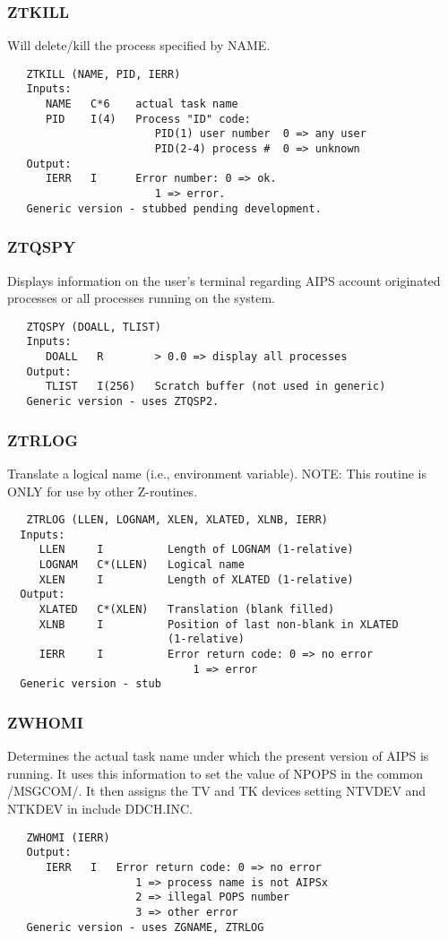 \subsubsection{ZTKILL}
Will delete/kill the process specified by NAME.
\begin{verbatim}
   ZTKILL (NAME, PID, IERR)
   Inputs:
      NAME   C*6    actual task name
      PID    I(4)   Process "ID" code:
                       PID(1) user number  0 => any user
                       PID(2-4) process #  0 => unknown
   Output:
      IERR   I      Error number: 0 => ok.
                       1 => error.
   Generic version - stubbed pending development.
\end{verbatim}

\subsubsection{ZTQSPY}
Displays information on the user's terminal regarding AIPS account
originated processes or all processes running on the system.
\begin{verbatim}
   ZTQSPY (DOALL, TLIST)
   Inputs:
      DOALL   R        > 0.0 => display all processes
   Output:
      TLIST   I(256)   Scratch buffer (not used in generic)
   Generic version - uses ZTQSP2.
\end{verbatim}
\subsubsection{ZTRLOG}
Translate a logical name (i.e., environment variable).
NOTE: This routine is ONLY for use by other Z-routines.
\begin{verbatim}
   ZTRLOG (LLEN, LOGNAM, XLEN, XLATED, XLNB, IERR)
  Inputs:
     LLEN     I          Length of LOGNAM (1-relative)
     LOGNAM   C*(LLEN)   Logical name
     XLEN     I          Length of XLATED (1-relative)
  Output:
     XLATED   C*(XLEN)   Translation (blank filled)
     XLNB     I          Position of last non-blank in XLATED
                         (1-relative)
     IERR     I          Error return code: 0 => no error
                             1 => error
  Generic version - stub
\end{verbatim}

\subsubsection{ZWHOMI}
Determines the actual task name under which the present
version of AIPS is running.  It uses this information to set the
value of NPOPS in the common /MSGCOM/.  It then assigns the TV and
TK devices setting NTVDEV and NTKDEV in include DDCH.INC.
\begin{verbatim}
   ZWHOMI (IERR)
   Output:
      IERR   I   Error return code: 0 => no error
                    1 => process name is not AIPSx
                    2 => illegal POPS number
                    3 => other error
   Generic version - uses ZGNAME, ZTRLOG
\end{verbatim}

